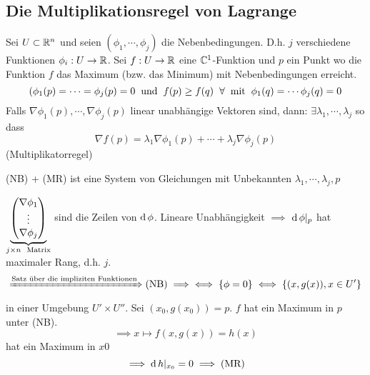 \subsection{Die Multiplikationsregel von Lagrange}
\begin{Sat}
  Sei $U\subset\mathbb{R}^n$ und seien $(\phi_1,\cdots,\phi_j)$ die Nebenbedingungen. D.h. $j$ verschiedene Funktionen $\phi_i:U\rightarrow\mathbb{R}$. Sei $f:U\rightarrow\mathbb{R}$ eine $\mathbb{C}^1$-Funktion und $p$ ein Punkt wo die Funktion $f$ das Maximum (bzw. das Minimum) mit Nebenbedingungen erreicht.
  \[(\phi_1(p)=\cdots=\phi_j(p)=0\hspace{2mm}\text{und}\hspace{2mm} f(p)\geq f(q)\hspace{2mm}\forall\hspace{2mm}\text{mit}\hspace{2mm}\phi_1(q)=\cdots\phi_j(q)=0\]
  Falls $\nabla\phi_1(p),\cdots,\nabla\phi_j(p)$ linear unabhängige Vektoren sind, dann: $\exists \lambda_1,\cdots,\lambda_j$ so dass
  \[\nabla f(p)=\lambda_1\nabla\phi_1(p)+\cdots+\lambda_j\nabla\phi_j(p)\]
  (Multiplikatorregel)
\end{Sat}
\begin{Bem}
  (NB) + (MR) ist eine System von Gleichungen mit Unbekannten $\lambda_1,\cdots,\lambda_j, p$
\end{Bem}
\begin{Bem}
  $ \underbrace{\begin{pmatrix}
    \nabla\phi_1\\ \vdots \\ \nabla\phi_j
  \end{pmatrix}}_{j\times n \hspace{2mm}\text{Matrix}} $ sind die Zeilen von $\operatorname{d} \phi$. Lineare Unabhängigkeit $\implies$ $\operatorname{d} \phi|_p$ hat maximaler Rang, d.h. $j$. 
  \[\xRightarrow{\text{Satz über die impliziten Funktionen}} \text{(NB)}\implies \iff \left\{ \phi=0 \right\}\iff \left\{ (x,g(x)), x\in U' \right\}\]
  in einer Umgebung $U'\times U''$.
  Sei $(x_0,g(x_0))=p$. $f$ hat ein Maximum in $p$ unter (NB).
  \[\implies x\mapsto f(x,g(x))=h(x)\]
  hat ein Maximum in $x0$
  \[\implies\operatorname{d} h|_{x_0}=0\implies\text{(MR)}\]
\end{Bem}
